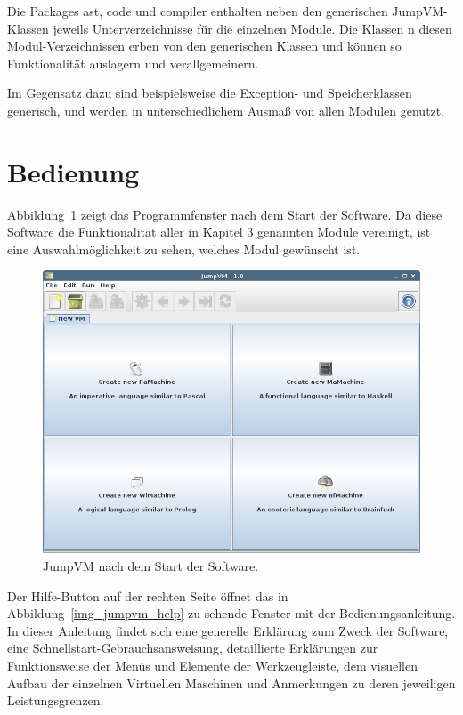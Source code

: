 \documentclass[german, a4paper, parskip, bibliography=totoc]{scrartcl}
\begin{document}
Die Packages ast, code und compiler enthalten neben den generischen
JumpVM-Klassen jeweils Unterverzeichnisse für die einzelnen Module. Die Klassen
n diesen Modul-Verzeichnissen erben von den generischen Klassen und können so
Funktionalität auslagern und verallgemeinern.

Im Gegensatz dazu sind beispielsweise die Exception- und Speicherklassen
generisch, und werden in unterschiedlichem Ausmaß von allen Modulen genutzt.


\section{Bedienung}
Abbildung~\ref{img_jumpvm_start} zeigt das Programmfenster nach dem Start der
Software. Da diese Software die Funktionalität aller in Kapitel 3 genannten
Module vereinigt, ist eine Auswahlmöglichkeit zu sehen, welches Modul gewünscht
ist.

\begin{figure}[htb]
    \centering
    \includegraphics[width=\textwidth]{screenshot_start.png}
    \caption{JumpVM nach dem Start der Software.}
    \label{img_jumpvm_start}
\end{figure}

Der Hilfe-Button auf der rechten Seite öffnet das in Abbildung~\ref{img_jumpvm_help}
zu sehende Fenster mit der Bedienungsanleitung. In dieser
Anleitung findet sich eine generelle Erklärung zum Zweck der Software, eine
Schnellstart-Gebrauchsansweisung, detaillierte Erklärungen zur Funktionsweise
der Menüs und Elemente der Werkzeugleiste, dem visuellen Aufbau der einzelnen
Virtuellen Maschinen und Anmerkungen zu deren jeweiligen Leistungsgrenzen.
\end{document}
